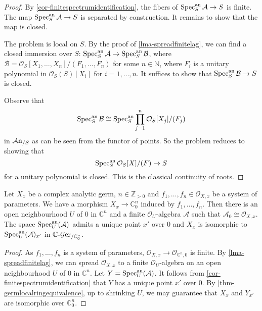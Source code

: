 \begin{proof}
    By \cref{cor-finitespectrumidentification}, the fibers of $\operatorname{Spec}^{\mathrm{an}}_S \mathcal{A}\rightarrow S$ is finite. The map $\operatorname{Spec}^{\mathrm{an}}_S \mathcal{A}\rightarrow S$ is separated by construction. It remains to show that the map is closed.

    The problem is local on $S$.
    By the proof of \cref{lma-spreadfinitelag}, we can find a closed immersion over $S$: $\operatorname{Spec}^{\mathrm{an}}_S \mathcal{A}\rightarrow \operatorname{Spec}^{\mathrm{an}}_S\mathcal{B}$, where $\mathcal{B}=\mathcal{O}_S[X_1,\ldots,X_n]/(F_1,\ldots,F_n)$ for some $n\in \mathbb{N}$, where $F_i$ is a unitary polynomial in $\mathcal{O}_S(S)[X_i]$ for $i=1,\ldots,n$. It suffices to show that $\operatorname{Spec}^{\mathrm{an}}_S \mathcal{B}\rightarrow S$ is closed.

    Observe that
    \[
        \operatorname{Spec}^{\mathrm{an}}_S \mathcal{B}\cong \operatorname{Spec}^{\mathrm{an}}_S \prod_{j=1}^n \mathcal{O}_S[X_j]/(F_j)
    \]
    in $\mathcal{A}\mathrm{n}_{/S}$ as can be seen from the functor of points. So the problem reduces to showing that 
    \[
        \operatorname{Spec}_S^{\mathrm{an}} \mathcal{O}_S[X]/(F)\rightarrow S  
    \]
    for a unitary polynomial is closed. This is the classical continuity of roots.
\end{proof}

\begin{corollary}\label{cor-morphismdefinedbygeneratorlocal}
    Let $X_x$ be a complex analytic germ, $n\in \mathbb{Z}_{>0}$ and $f_1,\ldots,f_n\in \mathcal{O}_{X,x}$ be a system of parameters. We have a morphism $X_x\rightarrow \mathbb{C}^n_0$ induced by $f_1,\ldots,f_n$. Then there is an open neighbourhood $U$ of $0$ in $\mathbb{C}^n$ and a finite $\mathcal{O}_U$-algebra $\mathcal{A}$ such that $\mathcal{A}_0\cong \mathcal{O}_{X,x}$. The space $\operatorname{Spec}^{\mathrm{an}}_{U}(\mathcal{A})$ admits a unique point $x'$ over $0$ and $X_x$ is isomorphic to $\operatorname{Spec}^{\mathrm{an}}_{U}(\mathcal{A})_{x'}$ in $\mathbb{C}\text{-}\mathcal{G}\mathrm{er}_{/\mathbb{C}^n_0}$.
\end{corollary}
\begin{proof}
    As $f_1,\ldots,f_n$ is a system of parameters, $\mathcal{O}_{X,x}\rightarrow \mathcal{O}_{\mathbb{C}^n,0}$ is finite. By \cref{lma-spreadfinitelag}, we can spread $\mathcal{O}_{X,x}$ to a finite $\mathcal{O}_U$-algebra on an open neighbourhood $U$ of $0$ in $\mathbb{C}^n$. Let $Y=\operatorname{Spec}^{\mathrm{an}}_{U}(\mathcal{A})$. 
    It follows from \cref{cor-finitespectrumidentification} that $Y$ has a unique point $x'$ over $0$. By \cref{thm-germlocalringequivalence}, up to shrinking $U$, we may guarantee that $X_x$ and $Y_{x'}$ are isomorphic over $\mathbb{C}^n_0$.
\end{proof}



